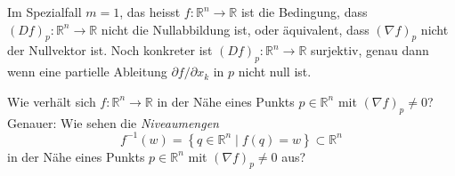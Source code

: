 \documentclass[../main.tex]{subfiles}
\begin{document}
Im Spezialfall $m = 1$, das heisst $f \colon \mathbb{R}^n \to \mathbb{R}$
ist die Bedingung, dass ${(Df)}_p \colon \mathbb{R}^n \to \mathbb{R}$
nicht die Nullabbildung ist, oder äquivalent, dass
${(\nabla f)}_p$ nicht der Nullvektor ist.
Noch konkreter ist $({Df})_p \colon \mathbb{R}^n \to \mathbb{R}$
surjektiv, genau dann wenn eine partielle Ableitung $\partial f / \partial x_k$
in $p$ nicht null ist.

\begin{question}
  Wie verhält sich $f \colon \mathbb{R}^n \to \mathbb{R}$
  in der Nähe eines Punkts $p \in \mathbb{R}^n$ mit
  ${(\nabla f)}_p \neq 0$? Genauer: Wie sehen die
  \emph{Niveaumengen}
  \[
    f^{-1}(w) = \left\{q \in \mathbb{R}^n \mid f(q) = w\right\}
    \subset \mathbb{R}^n
  \]
  in der Nähe eines Punkts $p \in \mathbb{R}^n$
  mit ${(\nabla f)}_p \neq 0$ aus?
\end{question}
\end{document}
